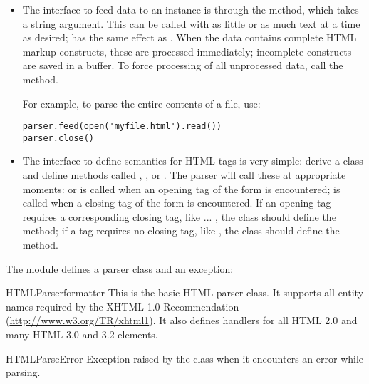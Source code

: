 \begin{itemize}

\item
The interface to feed data to an instance is through the 
method, which takes a string argument.  This can be called with as
little or as much text at a time as desired;  has the same effect as .  When the data
contains complete HTML markup constructs, these are processed immediately;
incomplete constructs are saved in a buffer.  To force processing of all
unprocessed data, call the  method.

For example, to parse the entire contents of a file, use:
\begin{verbatim}
parser.feed(open('myfile.html').read())
parser.close()
\end{verbatim}

\item
The interface to define semantics for HTML tags is very simple: derive
a class and define methods called ,
, or .  The parser will
call these at appropriate moments:  or
 is called when an opening tag of the form
 is encountered;  is called
when a closing tag of the form  is encountered.  If
an opening tag requires a corresponding closing tag, like 
... , the class should define the 
method; if a tag requires no closing tag, like , the class
should define the  method.

\end{itemize}

The module defines a parser class and an exception:

\begin{classdesc}{HTMLParser}{formatter}
This is the basic HTML parser class.  It supports all entity names
required by the XHTML 1.0 Recommendation (\url{http://www.w3.org/TR/xhtml1}).  
It also defines handlers for all HTML 2.0 and many HTML 3.0 and 3.2 elements.
\end{classdesc}

\begin{excdesc}{HTMLParseError}
Exception raised by the  class when it encounters an
error while parsing.
\end{excdesc}


